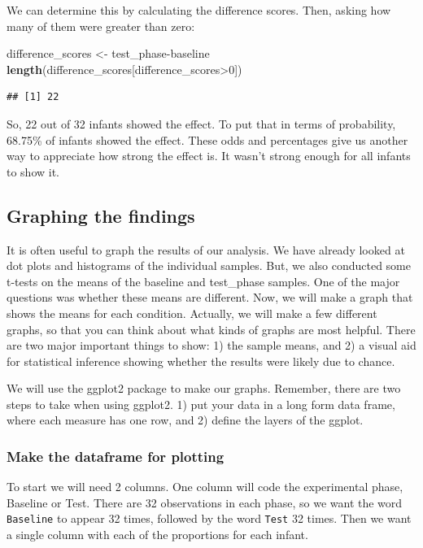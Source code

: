 \documentclass[]{book}
\newenvironment{Shaded}{\begin{snugshade}}{\end{snugshade}}
\newcommand{\KeywordTok}[1]{\textcolor[rgb]{0.13,0.29,0.53}{\textbf{{#1}}}}
\newcommand{\DecValTok}[1]{\textcolor[rgb]{0.00,0.00,0.81}{{#1}}}
\newcommand{\StringTok}[1]{\textcolor[rgb]{0.31,0.60,0.02}{{#1}}}
\newcommand{\NormalTok}[1]{{#1}}
\theoremstyle{definition}
\theoremstyle{definition}
\theoremstyle{definition}
\theoremstyle{remark}
\begin{document}
We can determine this by calculating the difference scores. Then, asking
how many of them were greater than zero:

\begin{Shaded}
\begin{Highlighting}[]
\NormalTok{difference_scores <-}\StringTok{ }\NormalTok{test_phase-baseline}
\KeywordTok{length}\NormalTok{(difference_scores[difference_scores>}\DecValTok{0}\NormalTok{])}
\end{Highlighting}
\end{Shaded}

\begin{verbatim}
## [1] 22
\end{verbatim}

So, 22 out of 32 infants showed the effect. To put that in terms of
probability, 68.75\% of infants showed the effect. These odds and
percentages give us another way to appreciate how strong the effect is.
It wasn't strong enough for all infants to show it.

\subsection{Graphing the findings}\label{graphing-the-findings}

It is often useful to graph the results of our analysis. We have already
looked at dot plots and histograms of the individual samples. But, we
also conducted some t-tests on the means of the baseline and test\_phase
samples. One of the major questions was whether these means are
different. Now, we will make a graph that shows the means for each
condition. Actually, we will make a few different graphs, so that you
can think about what kinds of graphs are most helpful. There are two
major important things to show: 1) the sample means, and 2) a visual aid
for statistical inference showing whether the results were likely due to
chance.

We will use the ggplot2 package to make our graphs. Remember, there are
two steps to take when using ggplot2. 1) put your data in a long form
data frame, where each measure has one row, and 2) define the layers of
the ggplot.

\subsubsection{Make the dataframe for
plotting}\label{make-the-dataframe-for-plotting}

To start we will need 2 columns. One column will code the experimental
phase, Baseline or Test. There are 32 observations in each phase, so we
want the word \texttt{Baseline} to appear 32 times, followed by the word
\texttt{Test} 32 times. Then we want a single column with each of the
proportions for each infant.
\end{document}
